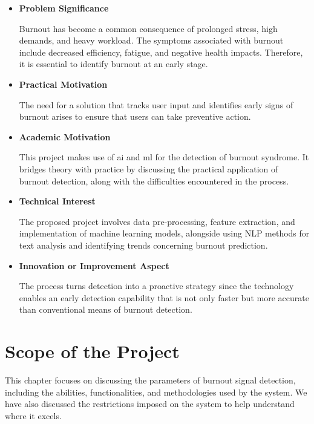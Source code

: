 \begin{itemize}

\item \textbf{Problem Significance}

Burnout has become a common consequence of prolonged stress, high demands, and heavy workload. The symptoms associated with burnout include decreased efficiency, fatigue, and negative health impacts. Therefore, it is essential to identify burnout at an early stage.

\item \textbf{Practical Motivation}

The need for a solution that tracks user input and identifies early signs of burnout arises to ensure that users can take preventive action.

\item \textbf{Academic Motivation}

This project makes use of \ac{ai} and \ac{ml} for the detection of burnout syndrome. It bridges theory with practice by discussing the practical application of burnout detection, along with the difficulties encountered in the process.

\item \textbf{Technical Interest}

The proposed project involves data pre-processing, feature extraction, and implementation of machine learning models, alongside using NLP methods for text analysis and identifying trends concerning burnout prediction.

\item \textbf{Innovation or Improvement Aspect}

The process turns detection into a proactive strategy since the technology enables an early detection capability that is not only faster but more accurate than conventional means of burnout detection.

\end{itemize}

\section{Scope of the Project}

This chapter focuses on discussing the parameters of burnout signal detection, including the abilities, functionalities, and methodologies used by the system. We have also discussed the restrictions imposed on the system to help understand where it excels.

